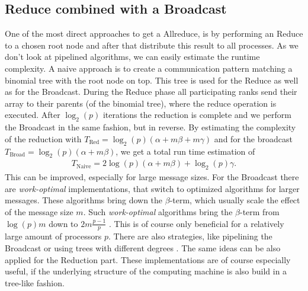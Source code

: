 \subsection{Reduce combined with a Broadcast} \label{ReducePlusBroadcast}
One of the most direct approaches to get a Allreduce, is by performing an Reduce to a chosen root node and after that distribute this result to all processes. As we don't look at pipelined algorithms, we can easily estimate the runtime complexity. A naive approach \cite{AllreduceSummaryAll} is to create a communication pattern matching a binomial tree with the root node on top. This tree is used for the Reduce as well as for the Broadcast. During the Reduce phase all participating ranks send their array to their parents (of the binomial tree), where the reduce operation is executed. After $\log_2(p)$ iterations the reduction is complete and we perform the Broadcast in the same fashion, but in reverse. By estimating the complexity of the reduction with $T_\textrm{Red} = \log_2(p)(\alpha + m \beta + m \gamma) $ and for the broadcast $T_\textrm{Broad} = \log_2(p)(\alpha + m \beta) $, we get a total run time estimation of
\begin{align}
	T_\mathrm{Naive} = 2 \log(p) (\alpha + m \beta) + \log_2(p) \gamma. \label{eq:BroadcastNaive}
\end{align}
This can be improved, especially for large message sizes. For the Broadcast there are \textit{work-optimal} implementations, that switch to optimized algorithms for larger messages. These algorithms bring down the $\beta$-term, which usually scale the effect of the message size $m$. Such \textit{work-optimal} algorithms bring the $\beta$-term from $\log(p)m$ down to $2 m \frac{p-1}{p}$ \cite{BroadcastWorkOpt, BroadcastAlgos}. This is of course only beneficial for a relatively large amount of processors $p$. There are also strategies, like pipelining the Broadcast or using trees with different degrees \cite{pipelinedBroadcast, karyTrees}. The same ideas can be also applied for the Reduction part. These implementations are of course especially useful, if the underlying structure of the computing machine is also build in a tree-like fashion.


